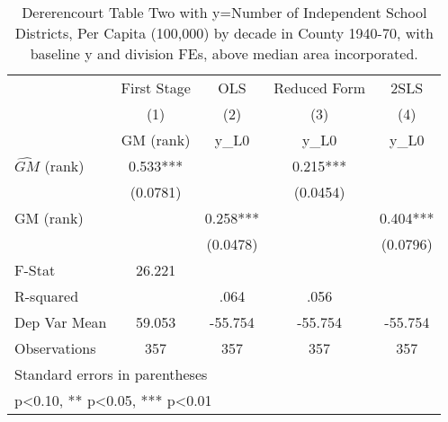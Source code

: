 \begin{table}[htbp]\centering
\def\sym#1{\ifmmode^{#1}\else\(^{#1}\)\fi}
\caption{Dererencourt Table Two with y=Number of Independent School Districts, Per Capita (100,000) by decade in County 1940-70, with baseline y and division FEs, above median area incorporated.}
\begin{tabular}{l*{4}{c}}
\toprule
                    & First Stage   &         OLS   &Reduced Form   &        2SLS   \\
                    &\multicolumn{1}{c}{(1)}&\multicolumn{1}{c}{(2)}&\multicolumn{1}{c}{(3)}&\multicolumn{1}{c}{(4)}\\
                    &\multicolumn{1}{c}{GM  (rank)}&\multicolumn{1}{c}{y\_L0}&\multicolumn{1}{c}{y\_L0}&\multicolumn{1}{c}{y\_L0}\\
\midrule
$\hat{GM}$ (rank)   &       0.533***&               &       0.215***&               \\
                    &    (0.0781)   &               &    (0.0454)   &               \\
\addlinespace
GM  (rank)          &               &       0.258***&               &       0.404***\\
                    &               &    (0.0478)   &               &    (0.0796)   \\
\midrule
F-Stat              &      26.221   &               &               &               \\
R-squared           &               &        .064   &        .056   &               \\
Dep Var Mean        &      59.053   &     -55.754   &     -55.754   &     -55.754   \\
Observations        &         357   &         357   &         357   &         357   \\
\bottomrule
\multicolumn{5}{l}{\footnotesize Standard errors in parentheses}\\
\multicolumn{5}{l}{\footnotesize * p<0.10, ** p<0.05, *** p<0.01}\\
\end{tabular}
\end{table}
